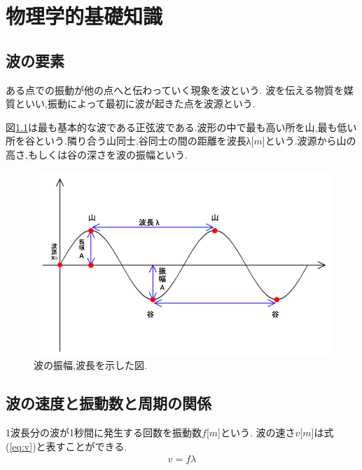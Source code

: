 

\chapter{物理学的基礎知識}
\section{波の要素}
ある点での振動が他の点へと伝わっていく現象を波という.
波を伝える物質を媒質といい,振動によって最初に波が起きた点を波源という.

図\ref{fig:sin}は最も基本的な波である正弦波である.波形の中で最も高い所を山,最も低い所を谷という.隣り合う山同士,谷同士の間の距離を波長λ[$m$]という.波源から山の高さ,もしくは谷の深さを波の振幅という.



\begin{figure}[htbp]
 \begin{center}
  \includegraphics[width=150mm]{../background/lambdasin.png}
 \end{center}
 \caption{波の振幅,波長を示した図.}
 \label{fig:sin}
\end{figure}

\newpage

\section{波の速度と振動数と周期の関係}
1波長分の波が1秒間に発生する回数を振動数$f$[$m$]という.
波の速さ$v$[$m$]は式(\ref{eq:v})と表すことができる.
\begin{eqnarray}
\label{eq:v}
v=fλ
\end{eqnarray}

